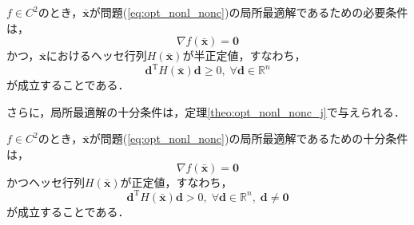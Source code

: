 \documentclass{jsreport}
\begin{document}
\begin{theo}\label{theo:opt_nonl_nonc_h_2}
  $f \in C^2$のとき，$\bar{\bm{x}}$が問題(\ref{eq:opt_nonl_nonc})の局所最適解であるための必要条件は，
  \begin{equation}
    \nabla f(\bar{\bm{x}}) = \bm{0} \nonumber
  \end{equation}
  かつ，$\bar{\bm{x}}$におけるヘッセ行列$H(\bar{\bm{x}})$が半正定値，すなわち，
  \begin{equation}
    \bm{d}^{\mathrm{T}} H(\bar{\bm{x}}) \bm{d} \geq 0, \; \forall \bm{d} \in \mathbb{R}^n \nonumber
  \end{equation}
  が成立することである．
\end{theo}

さらに，局所最適解の十分条件は，定理\ref{theo:opt_nonl_nonc_j}で与えられる．
\begin{theo}\label{theo:opt_nonl_nonc_j}
  $f \in C^2$のとき，$\bar{\bm{x}}$が問題(\ref{eq:opt_nonl_nonc})の局所最適解であるための十分条件は，
  \begin{equation}
    \nabla f(\bar{\bm{x}}) = \bm{0} \nonumber
  \end{equation}
  かつヘッセ行列$H(\bar{\bm{x}})$が正定値，すなわち，
  \begin{equation}
    \bm{d}^{\mathrm{T}} H(\bar{\bm{x}}) \bm{d} > 0, \; \forall \bm{d} \in \mathbb{R}^n, \; \bm{d} \neq \bm{0} \nonumber
  \end{equation}
  が成立することである．
\end{theo}
\end{document}

